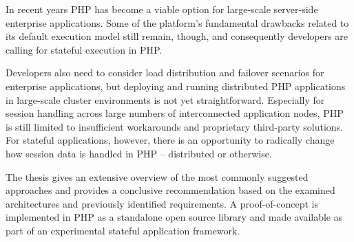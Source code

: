In recent years PHP has become a viable option for large-scale server-side enterprise applications. Some of the platform’s fundamental drawbacks related to its default execution model still remain, though, and consequently developers are calling for stateful execution in PHP.

Developers also need to consider load distribution and failover scenarios for enterprise applications, but deploying and running distributed PHP applications in large-scale cluster environments is not yet straightforward. Especially for session handling across large numbers of interconnected application nodes, PHP is still limited to insufficient workarounds and proprietary third-party solutions. For stateful applications, however, there is an opportunity to radically change how session data is handled in PHP – distributed or otherwise.

The thesis gives an extensive overview of the most commonly suggested approaches and provides a conclusive recommendation based on the examined architectures and previously identified requirements. A proof-of-concept is implemented in PHP as a standalone open source library and made available as part of an experimental stateful application framework.
